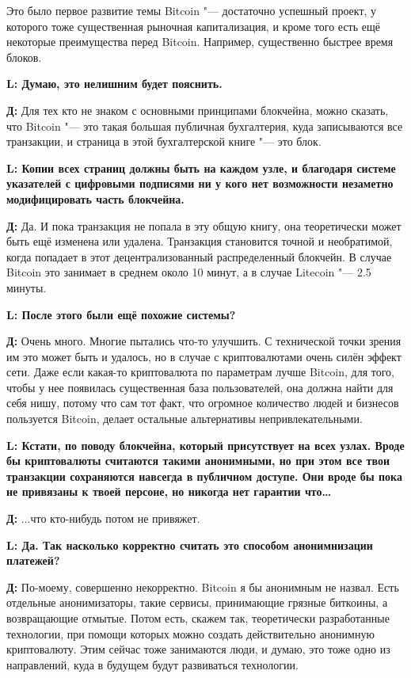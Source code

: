 \documentclass[10pt, a5paper]{article}
\begin{document}
Это было первое развитие темы Bitcoin "--- достаточно успешный проект, у которого тоже существенная рыночная капитализация, и кроме того есть ещё некоторые преимущества перед Bitcoin. Например, существенно быстрее время блоков. 


{\noindent \bf L: Думаю, это нелишним будет пояснить.}

{\noindent \bf Д:} Для тех кто не знаком с основными принципами блокчейна, можно сказать, что Bitcoin "--- это такая большая публичная бухгалтерия, куда записываются все транзакции, и страница в этой бухгалтерской книге "--- это блок.

{\noindent \bf L: Копии всех страниц должны быть на каждом узле, и благодаря системе указателей с цифровыми подписями ни у кого нет возможности незаметно модифицировать часть блокчейна.}

{\noindent \bf Д:} Да. И пока транзакция не попала в эту общую книгу, она теоретически может быть ещё изменена или удалена. Транзакция становится точной и необратимой, когда попадает в этот децентрализованный распределенный блокчейн. В случае Bitcoin это занимает в среднем около 10 минут, а в случае Litecoin "--- 2.5 минуты. 

{\noindent \bf L: После этого были ещё похожие системы?}

{\noindent \bf Д:} Очень много. Многие пытались что-то улучшить. С технической точки зрения им это может быть и удалось, но в случае с криптовалютами очень силён эффект сети. Даже если какая-то криптовалюта по параметрам  лучше Bitcoin, для того, чтобы у нее появилась существенная база пользователей, она должна найти для себя нишу, потому что сам тот факт, что огромное количество людей и бизнесов пользуется Bitcoin, делает остальные альтернативы непривлекательными.
 
{\noindent \bf L: Кстати, по поводу блокчейна, который присутствует на всех узлах. Вроде бы криптовалюты считаются такими анонимными, но при этом все твои транзакции сохраняются навсегда в публичном доступе. Они вроде бы пока не привязаны к твоей персоне, но никогда нет гарантии что\ldots}

{\noindent \bf Д:} ...что кто-нибудь потом не привяжет.


{\noindent \bf L: Да. Так насколько корректно считать это способом анонимнизации платежей?}

{\noindent \bf Д:} По-моему, совершенно некорректно. Bitcoin я бы анонимным не назвал. Есть отдельные анонимизаторы, такие сервисы, принимающие грязные биткоины, а возвращающие отмытые. Потом есть, скажем так, теоретически разработанные технологии, при помощи которых можно создать действительно анонимную криптовалюту. Этим сейчас тоже занимаются люди, и думаю, это тоже одно из направлений, куда в будущем будут развиваться технологии.
\end{document}
